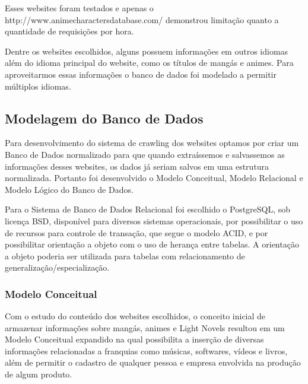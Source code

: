 \documentclass[12pt]{article}
\begin{document}
Esses websites foram testados e apenas o http://www.animecharactersdatabase.com/ demonstrou limitação quanto a quantidade de requisições por hora.

Dentre os websites escolhidos, alguns possuem informações em outros idiomas além do idioma principal do website, como os títulos de mangás e animes. Para aproveitarmos essas informações o banco de dados foi modelado a permitir múltiplos idiomas. 


\subsection{Modelagem do Banco de Dados}

Para desenvolvimento do sistema de crawling dos websites optamos por criar um Banco de Dados normalizado para que quando extraíssemos e salvassemos as informações desses websites, os dados já seriam salvos em uma estrutura normalizada. 
Portanto foi desenvolvido o Modelo Conceitual, Modelo Relacional e Modelo Lógico do Banco de Dados. 

Para o Sistema de Banco de Dados Relacional foi escolhido o PostgreSQL, sob licença BSD, disponível para diversos sistemas operacionais, por possibilitar o uso de recursos para controle de transação, que segue o modelo ACID, e por possibilitar orientação a objeto com o uso de herança entre tabelas. A orientação a objeto poderia ser utilizada para tabelas com relacionamento de generalização/especialização. 


\subsubsection{Modelo Conceitual}

Com o estudo do conteúdo dos websites escolhidos, o conceito inicial de armazenar informações sobre mangás, animes e Light Novels resultou em um Modelo Conceitual expandido na qual possibilita a inserção de diversas informações relacionadas a franquias como músicas, softwares, vídeos e livros, além de permitir o cadastro de qualquer pessoa e empresa envolvida na produção de algum produto.
\end{document}

